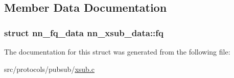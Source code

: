 \subsection{Member Data Documentation}
\subsubsection[{fq}]{\setlength{\rightskip}{0pt plus 5cm}struct {\bf nn\+\_\+fq\+\_\+data} nn\+\_\+xsub\+\_\+data\+::fq}\hypertarget{structnn__xsub__data_ac51715c35045378f68ac4ee64e426cac}{}\label{structnn__xsub__data_ac51715c35045378f68ac4ee64e426cac}


The documentation for this struct was generated from the following file\+:\begin{DoxyCompactItemize}
\item 
src/protocols/pubsub/\hyperlink{xsub_8c}{xsub.\+c}\end{DoxyCompactItemize}
